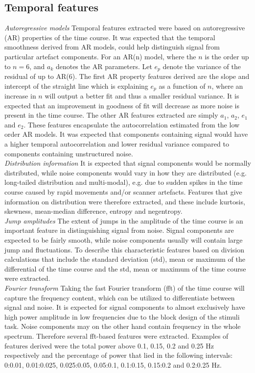 \subsection{Temporal features}
\textit{Autoregressive models} Temporal features extracted were based on autoregressive (AR) properties of the time course. It was expected that the temporal smoothness derived from AR models, could help distinguish signal from particular artefact components. For an AR(n) model, where the $n$ is the order up to $n = 6$, and $a_k$ denotes the AR parameters. Let $e_p$ denote the variance of the residual of up to AR(6). The first AR property features derived are the slope and intercept of the straight line which is explaining $e_p$ as a function of $n$, where an increase in $n$ will output a better fit and thus a smaller residual variance. It is expected that an improvement in goodness of fit will decrease as more noise is present in the time course. 
The other AR features extracted are simply $a_1$, $a_2$, $e_1$ and $e_2$. These features encapsulate the autocorrelation estimated from the low order AR models. It was expected that components containing signal would have a higher temporal autocorrelation and lower residual variance compared to components containing unstructured noise. \\
\textit{Distribution information} It is expected that signal components would be normally distributed, while noise components would vary in how they are distributed (e.g. long-tailed distribution and multi-modal), e.g. due to sudden spikes in the time course caused by rapid movements and/or scanner artefacts. Features that give information on distribution were therefore extracted, and these include kurtosis, skewness, mean-median difference, entropy and negentropy. \\
\textit{Jump amplitudes} The extent of jumps in the amplitude of the time course is an important feature in distinguishing signal from noise. Signal components are expected to be fairly smooth, while noise components usually will contain large jump and fluctuations. To describe this characteristic features based on division calculations that include the standard deviation (std), mean or maximum of the differential of the time course and the std, mean or maximum of the time course were extracted. \\
\textit{Fourier transform} Taking the fast Fourier transform (fft) of the time course will capture the frequency content, which can be utilized to differentiate between signal and noise. It is expected for signal components to almost exclusively have high power amplitude in low frequencies due to the block design of the stimuli task. Noise components may on the other hand contain frequency in the whole spectrum. Therefore several fft-based features were extracted. Examples of features derived were the total power above 0.1, 0.15, 0.2 and 0.25 Hz respectively and the percentage of power that lied in the following intervals: 0:0.01, 0.01:0.025, 0.025:0.05, 0.05:0.1, 0.1:0.15, 0.15:0.2 and 0.2:0.25 Hz. \\
